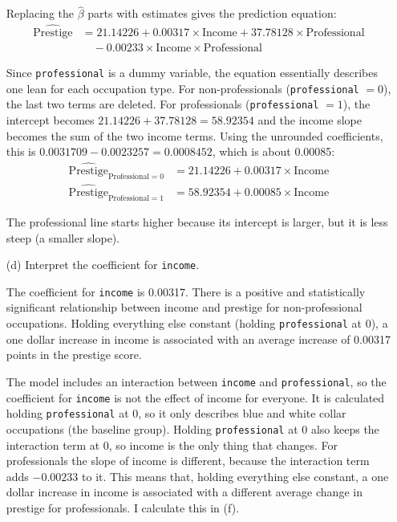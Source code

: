 \documentclass[12pt,letterpaper]{article}
\begin{document}
\begin{enumerate}
		\noindent Replacing the $\hat{\beta}$ parts with estimates gives the prediction equation:
		\begin{align*}
			\widehat{\text{Prestige}} &= 21.14226 + 0.00317 \times \text{Income} + 37.78128 \times \text{Professional} \\
			& \quad - 0.00233 \times \text{Income} \times \text{Professional}
		\end{align*}
		
		\noindent Since \texttt{professional} is a dummy variable, the equation essentially describes one lean for each occupation type. For non-professionals (\texttt{professional} $= 0$), the last two terms are deleted. For professionals (\texttt{professional} $= 1$), the intercept becomes $21.14226 + 37.78128 = 58.92354$ and the income slope becomes the sum of the two income terms. Using the unrounded coefficients, this is $0.0031709 - 0.0023257 = 0.0008452$, which is about 0.00085:
		\begin{align*}
			\widehat{\text{Prestige}}_{\text{Professional}=0} &= 21.14226 + 0.00317 \times \text{Income} \\
			\widehat{\text{Prestige}}_{\text{Professional}=1} &= 58.92354 + 0.00085 \times \text{Income}
		\end{align*}
		
		\noindent The professional line starts higher because its intercept is larger, but it is less steep (a smaller slope). 
	
		\newpage
		\item [(d)]
		Interpret the coefficient for \texttt{income}.
		\vspace{.25cm}
		
		\noindent The coefficient for \texttt{income} is 0.00317. There is a positive and statistically significant relationship between income and prestige for non-professional occupations. Holding everything else constant (holding \texttt{professional} at 0), a one dollar increase in income is associated with an average increase of 0.00317 points in the prestige score. 
		
		\vspace{.25cm}
		\noindent The model includes an interaction between \texttt{income} and \texttt{professional}, so the coefficient for \texttt{income} is not the effect of income for everyone. It is calculated holding \texttt{professional} at 0, so it only describes blue and white collar occupations (the baseline group). Holding \texttt{professional} at 0 also keeps the interaction term at 0, so income is the only thing that changes. For professionals the slope of income is different, because the interaction term adds $-0.00233$ to it. This means that, holding everything else constant, a one dollar increase in income is associated with a different average change in prestige for professionals. I calculate this in (f).
		

\end{enumerate}
\end{document}
